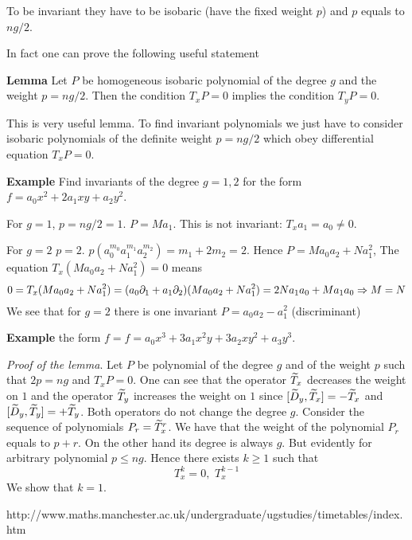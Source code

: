 To be invariant they have to be isobaric (have the fixed weight $p$) and $p$ equals to $ng/2$.

In fact one can prove the following useful statement

{\bf Lemma}  Let $P$ be homogeneous isobaric polynomial of the degree $g$ and the weight $p=ng/2$.
Then the condition $T_x P=0$ implies the condition $T_y P=0$.  

This is very useful lemma. To find invariant polynomials we just have to 
consider isobaric polynomials of the
definite weight $p=ng/2$ which obey differential equation $T_xP=0$.


{\bf Example} Find invariants of the degree $g=1,2$ for the form $f=a_0x^2+2a_1xy+a_2y^2$.

For $g=1$, $p=ng/2=1$. $P=Ma_1$. This is not invariant: $T_xa_1=a_0\not=0$.


For $g=2$ $p=2$.   $p(a_0^{m_0} a_1^{m_1}a_2^{m_2})=m_1+2m_2=2$. Hence
  $P=Ma_0a_2+Na_1^2$, The equation  $T_x(Ma_0a_2+Na_1^2)=0$ means
               $$
  0=T_x(Ma_0a_2+Na_1^2)=(a_0\partial_1+a_1\partial_2)(Ma_0a_2+Na_1^2)=2Na_1a_0+Ma_1a_0\Rightarrow M=N
               $$
We see that for $g=2$ there is one invariant $P=a_0a_2-a_1^2$ (discriminant)


 {\bf Example} the form $f=f=a_0x^3+3a_1x^2y+3a_2xy^2+a_3y^3$.
 


 \m

 {\sl Proof of the lemma}.  Let $P$ be polynomial of the degree $g$ and of the weight $p$ such that
 $2p=ng$ and $T_xP=0$. One can see that
 the operator $\widetilde T_x$ decreases the weight on $1$ and the operator $\widetilde T_y$ increases the weight on $1$
 since $[\widetilde D_y,\widetilde T_x]=-\widetilde T_x$ and $[\widetilde D_y,\widetilde T_y]=+\widetilde T_y$. Both operators do not change the degree $g$.
  Consider the sequence of polynomials
   $P_r=\widetilde T_x^r$. We have that the weight of the polynomial $P_r$ equals to $p+r$. On the other hand
   its degree is always $g$. But evidently for arbitrary polynomial $p\leq ng$. Hence there exists $k\geq 1$
   such that
            $$
     T_x^{k}=0, \,\, T_x^{k-1}       
            $$
We show that $k=1$.




 \m



\bye 





http://www.maths.manchester.ac.uk/undergraduate/ugstudies/timetables/index.htm
